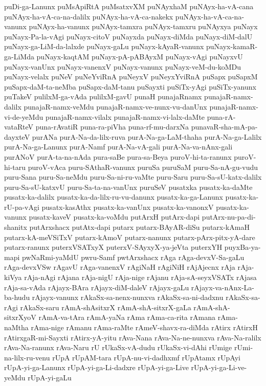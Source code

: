 {puDi-ga-Lanunx
puMsApiRtA
puMsatxvXM
puNAyxhaM
puNAyx-ha-vA-cana
puNAyx-ha-vA-ca-na-dalilx
puNAyx-ha-vA-ca-nakekx
puNAyx-ha-vA-ca-na-vanunx
puNAyx-ha-vanunx
puNAyx-tamxra
puNAyx-tamxru
puNAyxya
puNayx
puNayx-Pa-la-vAgi
puNayx-citoV
puNayxda
puNayx-diMda
puNayx-diM-dalU
puNayx-ga-LiM-da-lalxde
puNayx-gaLu
puNayx-kAyaR-vanunx
puNayx-kamaR-ga-LiMda
puNayx-kaqtAM
puNayx-pA-pABAyxM
puNayx-vAgi
puNayxvU
puNayx-vanUnx
puNayx-vanenxV
puNayx-vanunx
puNayx-veM-du-koMDu
puNayx-velalx
puNeV
puNeYviRnA
puNeyxV
puNeyxYviRnA
puSapx
puSapxM
puSapx-daM-ta-neMba
puSapx-daM-tanu
puSayxti
puSiTx-yAgi
puSiTx-yanunx
puTakeV
pulilxM-ga-vAda
pulilxM-gavU
punaH
punajaRnamx
punajaR-namx-dalilx
punajaR-namx-veMdu
punajaR-namx-ve-nunx-vu-danUnx
punajaR-namx-vi-de-yeMdu
punajaR-namx-vilalx
punajaR-namx-vi-lalx-daMte
puna-rA-vataRteV
puna-rAvatiR
puna-ra-piVha
puna-rf-mu-darxNa
punavaR-sha-mA-pa-dayxteV
purANa
purA-Na-da-lilx-ruva
purA-Na-ga-LaM-thaha
purA-Na-ga-Lalilx
purA-Na-ga-Lanunx
purA-Namf
purA-Na-vA-gali
purA-Na-va-nAnx-gali
purANoV
purA-ta-na-nAda
pura-saBe
pura-sa-Beya
puroV-hi-ta-ranunx
puroV-hi-taru
puroV-vAca
puru-SAthaR-vanunx
puruSa
puruSaM
puru-Sa-nA-gu-vudu
puru-Sana
puru-Sa-neMdu
puru-Sa-ni-ru-vaMte
puru-Saru
puru-Sa-sU-katx-dalilx
puru-Sa-sU-katxvU
puru-Sa-ta-na-vanUnx
puruSeV
pusatxka
pusatx-ka-daMte
pusatx-ka-dalilx
pusatx-ka-da-lilx-ru-vu-danunx
pusatx-ka-ga-Lanunx
pusatx-ka-rU-pa-vAgi
pusatx-kasAthx
pusatx-ka-vanUnx
pusatx-ka-vanonxV
pusatx-ka-vanunx
pusatx-kaveV
pusatx-ka-voMdu
putArxH
putArx-dapi
putArx-nu-pa-di-shanitx
putArxshacx
putAtx-dapi
putarx
putarx-BAyAR-diSu
putarx-kAmaH
putarx-kA-meVSiTxV
putarx-kAmoV
putarx-nanunx
putarx-pArx-pitx-yA-dare
putarx-ranunx
puterxVSATxyX
puterxV-SAyxyX-ya-jeVta
puterxYH
puyxBa-ya-mapi
pwNaRmi-yaMdU
pwru-Samf
pwtArxshacx
rAga
rAga-devxV-Sa-gaLu
rAga-devxVSw
rAgavU
rAga-vanenxV
rAgiNaH
rAgiNiH
rAjAjecnx
rAja
rAja-kiVya
rAja-nAgi
rAjana
rAja-nigU
rAja-nige
rAjanu
rAja-sA-seyxVSATx
rAjasa
rAja-sa-vAda
rAjayx-BAra
rAjayx-diM-daleV
rAjayx-gaLu
rAjayx-va-nAnx-La-ba-hudu
rAjayx-vanunx
rAkaSx-sa-nenx-nunxva
rAkaSx-sa-ni-dadxnu
rAkaSx-sa-rAgi
rAkaSx-saru
rAmA-shAsitxrX
rAmA-shA-sitxrX-gaLa
rAmA-shA-sitxrXyoV
rAmA-va-tAra
rAmA-yaNa
rAma
rAma-ca-rita
rAmana
rAma-naMtha
rAma-nige
rAmanu
rAma-raMte
rAmeV-shavx-ra-diMda
rAtirx
rAtirxH
rAtirxgaR-mi-Sayxti
rAtirx-yA-yitu
rAva-Nana
rAva-Na-ne-nunxva
rAva-Na-ralilx
rAva-Na-ranunx
rAva-Naru
rU
rUkaSx-vA-dudu
rUkaSx-vi-dAhi
rUmige
rUmi-na-lilx-ru-venu
rUpA
rUpAM-tara
rUpA-nu-vi-dadhxmf
rUpAtamx
rUpAyi
rUpA-yi-ga-Lanunx
rUpA-yi-ga-Li-dadxre
rUpA-yi-ga-Live
rUpA-yi-ga-Li-ve-yeMdu
rUpA-yi-gaLu
}
